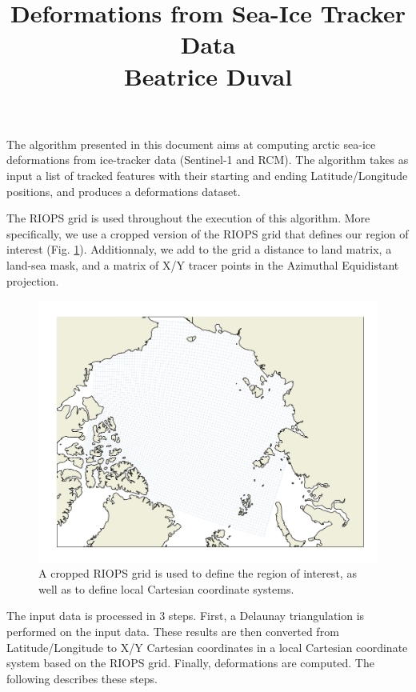 \documentclass[draft]{agujournal2018}
\begin{document}
\title{%
  Deformations from Sea-Ice Tracker Data \\
  \large Beatrice Duval}



The algorithm presented in this document aims at computing arctic sea-ice deformations from ice-tracker data (Sentinel-1 and RCM). The algorithm takes as input a list of tracked features with their starting and ending Latitude/Longitude positions, and produces a deformations dataset.

The RIOPS grid is used throughout the execution of this algorithm. More specifically, we use a cropped version of the RIOPS grid that defines our region of interest (Fig. \ref{grid}). Additionnaly, we add to the grid a distance to land matrix, a land-sea mask, and a matrix of X/Y tracer points in the Azimuthal Equidistant projection.  

\begin{figure}[h]
 \begin{center}
   \includegraphics[scale=.4]{figures/grid_lines.png}
 \end{center}
 \caption{A cropped RIOPS grid is used to define the region of interest, as well as to define local Cartesian coordinate systems.}
 \label{grid}
\end{figure}

The input data is processed in 3 steps. First, a Delaunay triangulation is performed on the input data. These results are then converted from Latitude/Longitude to X/Y Cartesian coordinates in a local Cartesian coordinate system based on the RIOPS grid. Finally, deformations are computed. The following describes these steps.
\end{document}
